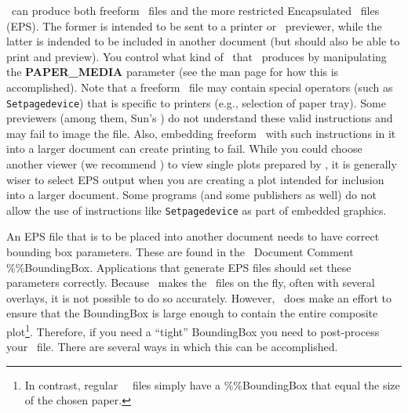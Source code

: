 \GMT\ can produce both freeform \PS\ files and the more
restricted Encapsulated \PS\ files (EPS).  The former is
intended to be sent to a printer or \PS\ previewer, while
the latter is indended to be included in another document
(but should also be able to print and preview).  You
control what kind of \PS\ that \GMT\ produces by manipulating
the {\bf PAPER\_MEDIA} parameter (see the  man
page for how this is accomplished).  Note that a freeform \PS\
file may contain special operators (such as \texttt{Setpagedevice})
that is specific to printers (e.g., selection of paper tray).
Some previewers (among them, Sun's ) do not
understand these valid instructions and may fail to image the file. Also, embedding freeform \PS\ with such instructions in it into a larger document can create printing to fail.
While you could choose another viewer (we recommend \progname{ghostview}) to view single plots prepared by \GMT, it is generally wiser to select EPS output when you are creating a plot intended for inclusion into a larger document. Some programs (and some publishers as well) do not allow the use of instructions like \texttt{Setpagedevice} as part of embedded graphics.

An EPS file that is to be placed into another document
needs to have correct bounding box
parameters.  These are found in the \PS\ Document
Comment \%\%BoundingBox.  Applications that generate EPS
files should set these parameters correctly.  Because \GMT\
makes the \PS\ files on the fly, often with several
overlays, it is not possible to do so accurately.  However,
\GMT\ does make an effort to ensure that the BoundingBox is
large enough to contain the entire composite plot\footnote{In contrast,
regular \GMT\ \PS\ files simply have
a \%\%BoundingBox that equal the size of the chosen paper.}.
Therefore, if you need a ``tight'' BoundingBox you need to post-process
your \PS\ file.  There are several ways in which this
can be accomplished.

